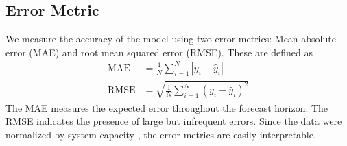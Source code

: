 \subsection{Error Metric}
We measure the accuracy of the model using two error metrics:
Mean absolute error (MAE) and root mean squared error (RMSE).
These are defined as
\begin{align}
  \text{MAE} &= \frac{1}{N}\sum_{i=1}^N\left|y_i - \hat{y}_i\right|\\
  \text{RMSE} &= \sqrt{\frac{1}{N}\sum_{i=1}^N\left(y_i - \hat{y}_i\right)^2}
\end{align}
The MAE measures the expected error throughout the forecast horizon. The RMSE
indicates the presence of large but infrequent errors. Since the data were
normalized by system capacity \cite{wang_quantifying_2016}, the error metrics
are easily interpretable.
